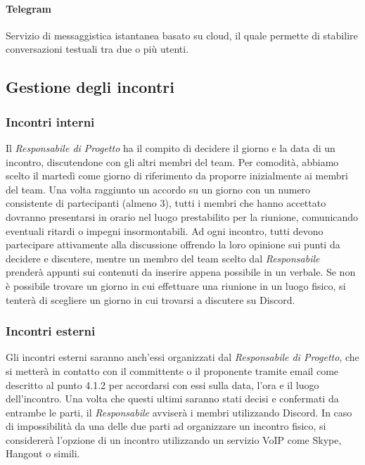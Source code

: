 \paragraph{Telegram}\Spazio
Servizio di messaggistica istantanea basato su cloud, il quale permette di stabilire conversazioni testuali tra due o più utenti.
\subsection{Gestione degli incontri}
\subsubsection{Incontri interni}
Il \emph{Responsabile di Progetto} ha il compito di decidere il giorno e la data di un incontro, discutendone con gli altri membri del team. Per comodità, abbiamo scelto il martedì come giorno di riferimento da proporre inizialmente ai membri del team.
\newline
Una volta raggiunto un accordo su un giorno con un numero consistente di partecipanti (almeno 3), tutti i membri che hanno accettato dovranno presentarsi in orario nel luogo prestabilito per la riunione, comunicando eventuali ritardi o impegni insormontabili.
Ad ogni incontro, tutti devono partecipare attivamente alla discussione offrendo la loro opinione sui punti da decidere e discutere, mentre un membro del team scelto dal \emph{Responsabile} prenderà appunti sui contenuti da inserire appena possibile in un verbale.
\newline
Se non è possibile trovare un giorno in cui effettuare una riunione in un luogo fisico, si tenterà di scegliere un giorno in cui trovarsi a discutere su Discord.

\subsubsection{Incontri esterni}
Gli incontri esterni saranno anch'essi organizzati dal \emph{Responsabile di Progetto}, che si metterà in contatto con il committente o il proponente tramite email come descritto al punto 4.1.2 per accordarsi con essi sulla data, l'ora e il luogo dell'incontro. Una volta che questi ultimi saranno stati decisi e confermati da entrambe le parti, il \emph{Responsabile} avviserà i membri utilizzando Discord.
In caso di impossibilità da una delle due parti ad organizzare un incontro fisico, si considererà l'opzione di un incontro utilizzando un servizio VoIP come Skype, Hangout o simili.

